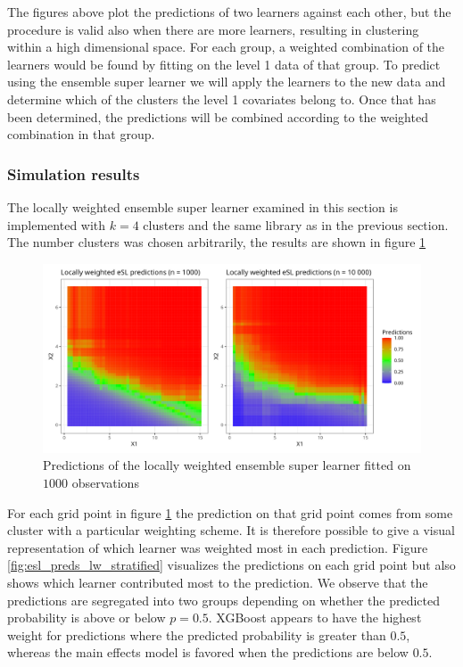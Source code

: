 \documentclass[./main.tex]{subfiles}
\begin{document}
The figures above plot the predictions of two learners against each other, but the procedure is valid also when there are more learners, resulting in clustering within a high dimensional space. For each group, a weighted combination of the learners would be found by fitting on the level 1 data of that group. To predict using the ensemble super learner we will apply the learners to the new data and determine which of the clusters the level 1 covariates belong to. Once that has been determined, the predictions will be combined according to the weighted combination in that group. 

\subsubsection{Simulation results}
The locally weighted ensemble super learner examined in this section is implemented with $ k = 4 $ clusters and the same library as in the previous section. The number clusters was chosen arbitrarily, the results are shown in figure \ref{fig:esl_preds_lw}
\begin{figure}[H]
    \centering
    \includegraphics[width=\textwidth]{figures/esl_preds_lw.png}
    \caption{Predictions of the locally weighted ensemble super learner fitted on $ 1000 $ observations}
    \label{fig:esl_preds_lw}
\end{figure}
For each grid point in figure \ref{fig:esl_preds_lw} the prediction on that grid point comes from some cluster with a particular weighting scheme. It is therefore possible to give a visual representation of which learner was weighted most in each prediction. Figure \ref{fig:esl_preds_lw_stratified} visualizes the predictions on each grid point but also shows which learner contributed most to the prediction. We observe that the predictions are segregated into two groups depending on whether the predicted probability is above or below $ p = 0.5 $. XGBoost appears to have the highest weight for predictions where the predicted probability is greater than $ 0.5 $, whereas the main effects model is favored when the predictions are below $ 0.5 $. 
\end{document}
